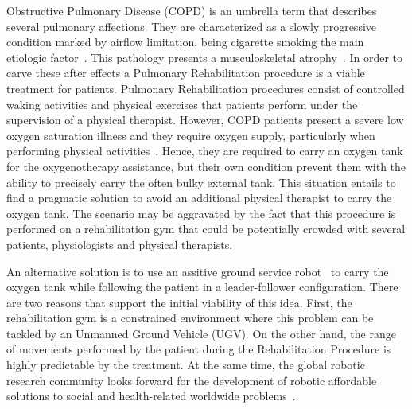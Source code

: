 \documentclass[journal]{IEEEtran}
\begin{document}
 Obstructive Pulmonary Disease (COPD) is an umbrella term that describes several pulmonary affections.  They are characterized as a slowly progressive condition marked by airflow limitation, being cigarette smoking the main etiologic factor~\cite{MacNee2005}. This pathology presents a musculoskeletal atrophy~\cite{Kocsis2016,Wu2012}. In order to carve these after effects a Pulmonary Rehabilitation procedure is a viable treatment for patients.  Pulmonary Rehabilitation procedures consist of controlled waking activities and physical exercises that patients perform under the supervision of a physical therapist.  However, COPD patients present a severe low oxygen saturation illness and they require oxygen supply, particularly when performing physical activities~\cite{Celli2014}.  Hence, they are required to carry an oxygen tank for the oxygenotherapy assistance, but their own condition prevent them with the ability to precisely carry the often bulky external tank.  This situation entails to find a pragmatic solution to avoid an additional physical therapist to carry the oxygen tank.  The scenario may be aggravated by the fact that this procedure is performed on a rehabilitation gym that could be potentially crowded with several patients, physiologists and physical therapists.  


An alternative solution is to use an assitive ground service robot~\cite{Neto2015} to carry the oxygen tank while following the patient in a leader-follower configuration.  There are two reasons that support the initial viability of this idea.  First,  the rehabilitation gym is a constrained environment where this problem can be tackled by an Unmanned Ground Vehicle (UGV).  On the other hand, the range of movements performed by the patient during the Rehabilitation Procedure is highly predictable by the treatment.  At the same time,  the global robotic research community looks forward for the development of robotic affordable solutions to social and health-related worldwide problems~\cite{Khamis2019}.
\end{document}
